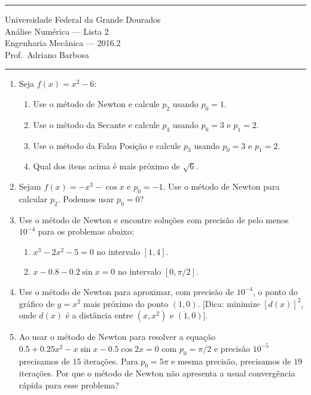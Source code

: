 \documentclass{article}
\begin{document}
\noindent{}\rule{\textwidth}{0.4pt}
\begin{center}
	Universidade Federal da Grande Dourados\\
	An\'alise Num\'erica --- Lista 2 \\
	Engenharia Mec\^anica --- 2016.2 \\
	Prof.\ Adriano Barbosa
\end{center}
\noindent{}\rule{\textwidth}{0.4pt}

\begin{enumerate}
	\item Seja $f(x) = x^2 - 6$:
		\begin{enumerate}
			\item Use o m\'etodo de Newton e calcule $p_2$ usando $p_0=1$.
			\item Use o m\'etodo da Secante e calcule $p_3$ usando $p_0=3$ e
				$p_1=2$.
			\item Use o m\'etodo da Falsa Posi\c{c}\~ao e calcule $p_3$ usando $p_0=3$
				e $p_1=2$.
			\item Qual dos itens acima \'e mais pr\'oximo de $\sqrt{6}$.
		\end{enumerate}

	\item Sejam $f(x) = -x^3-\cos{x}$ e $p_0=-1$. Use o m\'etodo de Newton para
		calcular $p_2$. Podemos usar $p_0=0$?

	\item Use o m\'etodo de Newton e encontre solu\c{c}\~oes com precis\~ao de pelo menos
		$10^{-4}$ para os problemas abaixo:
		\begin{enumerate}
			\item $x^3 - 2x^2 - 5 = 0$ no intervalo $[1,4]$.
			\item $x - 0.8 - 0.2\sin{x} = 0$ no intervalo $[0, \pi/2]$.
		\end{enumerate}

	\item Use o m\'etodo de Newton para aproximar, com precis\~ao de $10^{-4}$, o
		ponto do gr\'afico de $y=x^2$ mais pr\'oximo do ponto $(1,0)$. [Dica:
		minimize ${[d(x)]}^2$, onde $d(x)$ \'e a dist\^ancia entre $(x,x^2)$ e
		$(1,0)$].

	\item Ao usar o m\'etodo de Newton para resolver a equa\c{c}\~ao $0.5 +
		0.25x^2-x\sin{x}-0.5\cos{2x}=0$ com $p_0=\pi/2$ e precis\~ao $10^{-5}$
		precisamos de $15$ itera\c{c}\~oes. Para $p_0=5\pi$ e mesma precis\~ao,
		precisamos de $19$ itera\c{c}\~oes. Por que o m\'etodo de Newton n\~ao apresenta
		a usual converg\^encia r\'apida para esse problema?


\end{enumerate}
\end{document}
